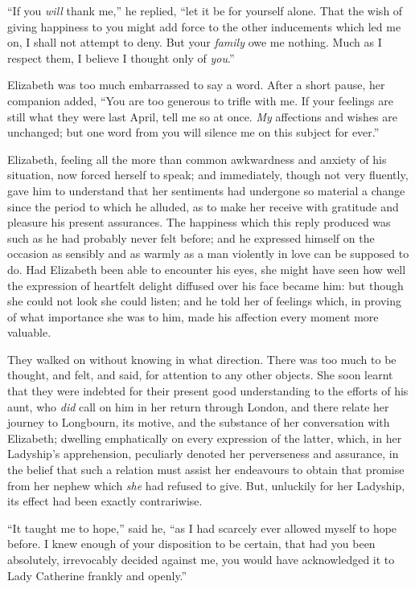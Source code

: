 \documentclass[12pt,openright]{book}
\begin{document}
“If you \textit{will} thank me,” he replied, “let it be for yourself alone. That the wish of giving happiness to you might add force to the other inducements which led me on, I shall not attempt to deny. But your \textit{family} owe me nothing. Much as I respect them, I believe I thought only of \textit{you}.”

Elizabeth was too much embarrassed to say a word. After a short pause, her companion added, “You are too generous to trifle with me. If your feelings are still what they were last April, tell me so at once. \textit{My} affections and wishes are unchanged; but one word from you will silence me on this subject for ever.”

Elizabeth, feeling all the more than common awkwardness and anxiety of his situation, now forced herself to speak; and immediately, though not very fluently, gave him to understand that her sentiments had undergone so material a change since the period to which he alluded, as to make her receive with gratitude and pleasure his present assurances. The happiness which this reply produced was such as he had probably never felt before; and he expressed himself on the occasion as sensibly and as warmly as a man violently in love can be supposed to do. Had Elizabeth been able to encounter his eyes, she might have seen how well the expression of heartfelt delight diffused over his face became him: but though she could not look she could listen; and he told her of feelings which, in proving of what importance she was to him, made his affection every moment more valuable.

They walked on without knowing in what direction. There was too much to be thought, and felt, and said, for attention to any other objects. She soon learnt that they were indebted for their present good understanding to the efforts of his aunt, who \textit{did} call on him in her return through London, and there relate her journey to Longbourn, its motive, and the substance of her conversation with Elizabeth; dwelling emphatically on every expression of the latter, which, in her Ladyship’s apprehension, peculiarly denoted her perverseness and assurance, in the belief that such a relation must assist her endeavours to obtain that promise from her nephew which \textit{she} had refused to give. But, unluckily for her Ladyship, its effect had been exactly contrariwise.

“It taught me to hope,” said he, “as I had scarcely ever allowed myself to hope before. I knew enough of your disposition to be certain, that had you been absolutely, irrevocably decided against me, you would have acknowledged it to Lady Catherine frankly and openly.”
\end{document}
